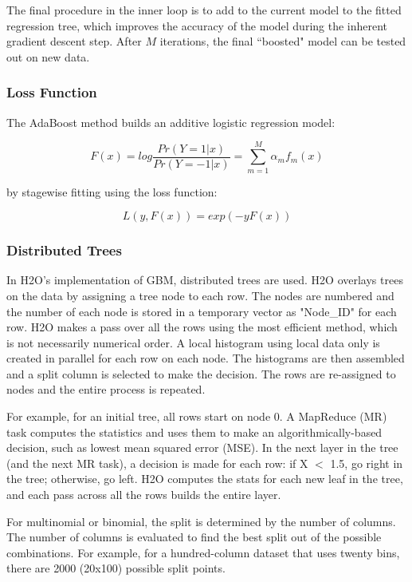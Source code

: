 \documentclass{article}[11pt]
\begin{document}
{\\
\\
The final procedure in the inner loop is to add to the current model to the fitted regression tree, which improves the accuracy of the model during the inherent gradient descent step. After $M$ iterations, the final ``boosted" model can be tested out on new data.

\subsubsection{Loss Function}

The AdaBoost method builds an additive logistic regression model:

$${F(x) = log}\frac{Pr(Y = 1|x)}{Pr(Y = -1|x)} = \sum_{m=1}^{M} \alpha_m f_m (x) $$

by stagewise fitting using the loss function: 

$$L(y, F(x)) = exp(-y  F (x)) $$



\subsubsection{Distributed Trees}

In H2O's implementation of GBM, distributed trees are used. H2O overlays trees on the data by assigning a tree node to each row. The nodes are numbered and the number of each node is stored in a temporary vector as "Node\_ID" for each row. H2O makes a pass over all the rows using the most efficient method, which is not necessarily numerical order. A local histogram using local data only is created in parallel for each row on each node. The histograms are then assembled and a split column is selected to make the decision. The rows are re-assigned to nodes and the entire process is repeated. 

For example, for an initial tree, all rows start on node 0. A MapReduce (MR) task computes the statistics and uses them to make an algorithmically-based decision, such as lowest mean squared error (MSE). In the next layer in the tree (and the next MR task), a decision is made for each row: if X $<$ 1.5, go right in the tree; otherwise, go left. H2O computes the stats for each new leaf in the tree, and each pass across all the rows builds the entire layer. 

For multinomial or binomial, the split is determined by the number of columns. The number of columns is evaluated to find the best split out of the possible combinations. For example, for a hundred-column dataset that uses twenty bins, there are 2000 (20x100) possible split points. 

}
\end{document}
